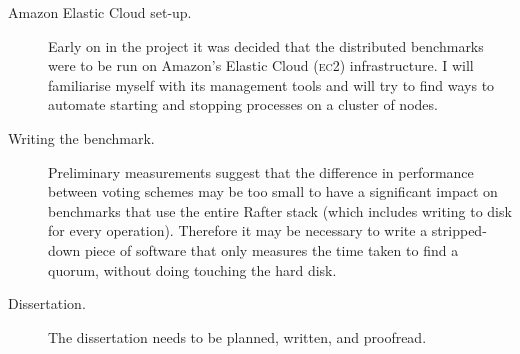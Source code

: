 \documentclass[11pt]{scrartcl}
\begin{document}
\begin{description}
    \item[Amazon Elastic Cloud set-up.] Early on in the project it was decided that the distributed benchmarks were to be run on Amazon's Elastic Cloud (\textsc{ec2}) infrastructure. I will familiarise myself with its management tools and will try to find ways to automate starting and stopping processes on a cluster of nodes.
    \item[Writing the benchmark.] Preliminary measurements suggest that the difference in performance between voting schemes may be too small to have a significant impact on benchmarks that use the entire Rafter stack (which includes writing to disk for every operation). Therefore it may be necessary to write a stripped-down piece of software that only measures the time taken to find a quorum, without doing touching the hard disk.
    \item[Dissertation.] The dissertation needs to be planned, written, and proofread.
\end{description}



\end{document}
